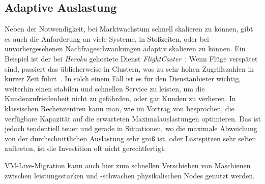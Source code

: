 \subsection{Adaptive Auslastung}
\label{sec:adaptive-auslastung}
Neben der Notwendigkeit, bei Marktwachstum schnell skalieren zu
können, gibt es auch die Anforderung an viele Systeme, in Stoßzeiten,
oder bei unvorhergesehenen Nachfrageschwankungen adaptiv skalieren zu
können. Ein Beispiel ist der bei \emph{Heroku} gehostete Dienst
\emph{FlightCaster}~\cite{flightcaster}: Wenn Flüge verspätet sind,
passiert das üblicherweise in Clustern, was zu sehr hohen
Zugriffszahlen in kurzer Zeit führt~\cite{flightcaster_success}. In
solch einem Fall ist es für den Dienstanbieter wichtig, weiterhin
einen stabilen und schnellen Service zu leisten, um die
Kundenzufriedenheit nicht zu gefährden, oder gar Kunden zu
verlieren. In klassischen Rechenzentren kann man, wie im Vortrag von
\cite{benchmarkingthecloud} besprochen, die verfügbare Kapazität auf
die erwarteten Maximalauslastungen optimieren. Das ist jedoch
tendentiell teuer und gerade in Situationen, wo die maximale
Abweichung von der durchschnittlichen Auslastung sehr groß ist, oder
Lastspitzen sehr selten auftreten, ist die Investition oft nicht
gerechtfertigt.

VM-Live-Migration kann auch hier zum schnellen Verschieben von
Maschienen zwischen leistungsstarken und -schwachen physikalischen
Nodes genutzt werden.

